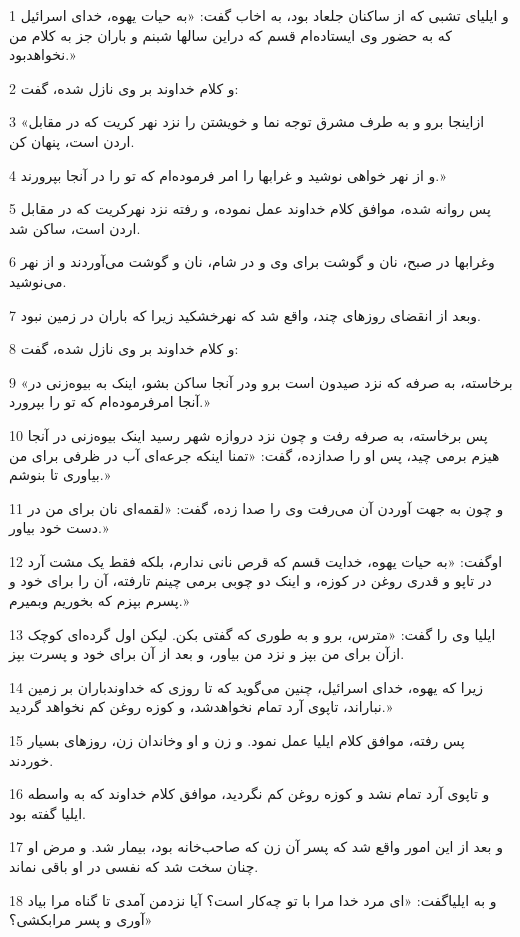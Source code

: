 \par 1 و ایلیای تشبی که از ساکنان جلعاد بود، به اخاب گفت: «به حیات یهوه، خدای اسرائیل که به حضور وی ایستاده‌ام قسم که دراین سالها شبنم و باران جز به کلام من نخواهدبود.»
\par 2 و کلام خداوند بر وی نازل شده، گفت:
\par 3 «ازاینجا برو و به طرف مشرق توجه نما و خویشتن را نزد نهر کریت که در مقابل اردن است، پنهان کن.
\par 4 و از نهر خواهی نوشید و غرابها را امر فرموده‌ام که تو را در آنجا بپرورند.»
\par 5 پس روانه شده، موافق کلام خداوند عمل نموده، و رفته نزد نهرکریت که در مقابل اردن است، ساکن شد.
\par 6 وغرابها در صبح، نان و گوشت برای وی و در شام، نان و گوشت می‌آوردند و از نهر می‌نوشید.
\par 7 وبعد از انقضای روزهای چند، واقع شد که نهرخشکید زیرا که باران در زمین نبود.
\par 8 و کلام خداوند بر وی نازل شده، گفت:
\par 9 «برخاسته، به صرفه که نزد صیدون است برو ودر آنجا ساکن بشو، اینک به بیوه‌زنی در آنجا امرفرموده‌ام که تو را بپرورد.» 
\par 10 پس برخاسته، به صرفه رفت و چون نزد دروازه شهر رسید اینک بیوه‌زنی در آنجا هیزم برمی چید، پس او را صدازده، گفت: «تمنا اینکه جرعه‌ای آب در ظرفی برای من بیاوری تا بنوشم.»
\par 11 و چون به جهت آوردن آن می‌رفت وی را صدا زده، گفت: «لقمه‌ای نان برای من در دست خود بیاور.»
\par 12 اوگفت: «به حیات یهوه، خدایت قسم که قرص نانی ندارم، بلکه فقط یک مشت آرد در تاپو و قدری روغن در کوزه، و اینک دو چوبی برمی چینم تارفته، آن را برای خود و پسرم بپزم که بخوریم وبمیرم.»
\par 13 ایلیا وی را گفت: «مترس، برو و به طوری که گفتی بکن. لیکن اول گرده‌ای کوچک ازآن برای من بپز و نزد من بیاور، و بعد از آن برای خود و پسرت بپز.
\par 14 زیرا که یهوه، خدای اسرائیل، چنین می‌گوید که تا روزی که خداوندباران بر زمین نباراند، تاپوی آرد تمام نخواهدشد، و کوزه روغن کم نخواهد گردید.»
\par 15 پس رفته، موافق کلام ایلیا عمل نمود. و زن و او وخاندان زن، روزهای بسیار خوردند.
\par 16 و تاپوی آرد تمام نشد و کوزه روغن کم نگردید، موافق کلام خداوند که به واسطه ایلیا گفته بود.
\par 17 و بعد از این امور واقع شد که پسر آن زن که صاحب‌خانه بود، بیمار شد. و مرض او چنان سخت شد که نفسی در او باقی نماند.
\par 18 و به ایلیاگفت: «ای مرد خدا مرا با تو چه‌کار است؟ آیا نزدمن آمدی تا گناه مرا بیاد آوری و پسر مرابکشی؟»
